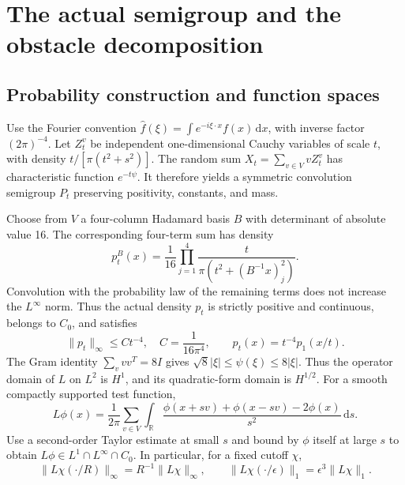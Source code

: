 \documentclass[11pt,a4paper]{article}
\theoremstyle{remark}\newtheorem{remark}[theorem]{Remark}
\newcommand{\R}{\mathbb R}\newcommand{\dd}{\,\mathrm d}
\newcommand{\1}{\mathbf1}\newcommand{\pos}[1]{(#1)_+}
\begin{document}
\section{The actual semigroup and the obstacle decomposition}
\subsection{Probability construction and function spaces}
Use the Fourier convention $\widehat f(\xi)=\int e^{-i\xi\cdot x}f(x)\dd x$, with inverse factor $(2\pi)^{-4}$. Let $Z_t^v$ be independent one-dimensional Cauchy variables of scale $t$, with density $t/[\pi(t^2+s^2)]$. The random sum $X_t=\sum_{v\in V}vZ_t^v$ has characteristic function $e^{-t\psi}$. It therefore yields a symmetric convolution semigroup $P_t$ preserving positivity, constants, and mass.

Choose from $V$ a four-column Hadamard basis $B$ with determinant of absolute value 16. The corresponding four-term sum has density
\[
 p_t^B(x)=\frac1{16}\prod_{j=1}^4\frac{t}{\pi(t^2+(B^{-1}x)_j^2)}.
\]
Convolution with the probability law of the remaining terms does not increase the $L^\infty$ norm. Thus the actual density $p_t$ is strictly positive and continuous, belongs to $C_0$, and satisfies
\begin{equation}\label{eq:heatbound}
 \|p_t\|_\infty\le C t^{-4},\quad C=\frac1{16\pi^4},\qquad p_t(x)=t^{-4}p_1(x/t).
\end{equation}
The Gram identity $\sum_v vv^T=8I$ gives $\sqrt8|\xi|\le\psi(\xi)\le8|\xi|$. Thus the operator domain of $L$ on $L^2$ is $H^1$, and its quadratic-form domain is $H^{1/2}$. For a smooth compactly supported test function,
\begin{equation}\label{eq:generator}
 L\phi(x)=\frac1{2\pi}\sum_{v\in V}\int_\R
 \frac{\phi(x+sv)+\phi(x-sv)-2\phi(x)}{s^2}\dd s.
\end{equation}
Use a second-order Taylor estimate at small $s$ and bound by $\phi$ itself at large $s$ to obtain $L\phi\in L^1\cap L^\infty\cap C_0$. In particular, for a fixed cutoff $\chi$,
\begin{equation}\label{eq:cutoff}
 \|L\chi(\cdot/R)\|_\infty=R^{-1}\|L\chi\|_\infty,
 \qquad \|L\chi(\cdot/\epsilon)\|_1=\epsilon^3\|L\chi\|_1.
\end{equation}
\end{document}
